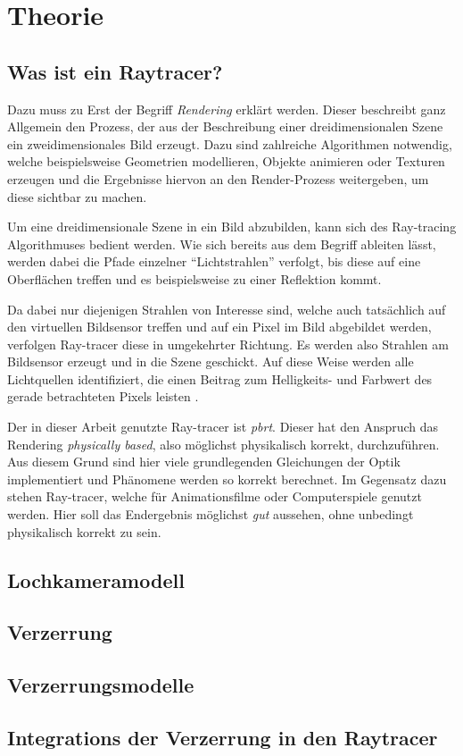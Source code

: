 \section{Theorie}

\subsection{Was ist ein Raytracer?}

Dazu muss zu Erst der Begriff \textit{Rendering} erklärt werden. Dieser beschreibt ganz Allgemein den Prozess, der aus der Beschreibung einer dreidimensionalen Szene ein zweidimensionales Bild erzeugt. Dazu sind zahlreiche Algorithmen notwendig, welche beispielsweise Geometrien modellieren, Objekte animieren oder Texturen erzeugen und die Ergebnisse hiervon an den Render-Prozess weitergeben, um diese sichtbar zu machen. 

Um eine dreidimensionale Szene in ein Bild abzubilden, kann sich des Ray-tracing Algorithmuses bedient werden. Wie sich bereits aus dem Begriff ableiten lässt, werden dabei die Pfade einzelner "`Lichtstrahlen"' verfolgt, bis diese auf eine Oberflächen treffen und es beispielsweise zu einer Reflektion kommt. 

Da dabei nur diejenigen Strahlen von Interesse sind, welche auch tatsächlich auf den virtuellen Bildsensor treffen und auf ein Pixel im Bild abgebildet werden, verfolgen Ray-tracer diese in umgekehrter Richtung. Es werden also Strahlen am Bildsensor erzeugt und in die Szene geschickt. Auf diese Weise werden alle Lichtquellen identifiziert, die einen Beitrag zum Helligkeits- und Farbwert des gerade betrachteten Pixels leisten \cite{pbrt_book}. 

Der in dieser Arbeit genutzte Ray-tracer ist \textit{pbrt}\cite{pbrt}. Dieser hat den Anspruch das Rendering \textit{physically based}, also möglichst physikalisch korrekt, durchzuführen. Aus diesem Grund sind hier viele grundlegenden Gleichungen der Optik implementiert und Phänomene werden so korrekt berechnet. Im Gegensatz dazu stehen Ray-tracer, welche für Animationsfilme oder Computerspiele genutzt werden. Hier soll das Endergebnis möglichst \textit{gut} aussehen, ohne unbedingt physikalisch korrekt zu sein. 

\subsection{Lochkameramodell}

\subsection{Verzerrung}

\subsection{Verzerrungsmodelle}

\subsection{Integrations der Verzerrung in den Raytracer}


